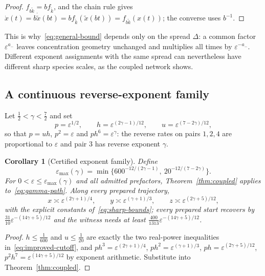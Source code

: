 \documentclass[11pt,a4paper]{article}
\theoremstyle{plain}
\newtheorem{corollary}[theorem]{Corollary}
\theoremstyle{definition}
\theoremstyle{remark}
\newcommand{\eps}{\varepsilon}
\begin{document}
\begin{proof}
$f_{b\tilde k}=bf_{\tilde k}$, and the chain rule gives $\dot x(t)=b\dot{\tilde x}(bt)=bf_{\tilde k}(\tilde x(bt))=f_{b\tilde k}(x(t))$; the converse uses $b^{-1}$.
\end{proof}

This is why~\eqref{eq:general-bound} depends only on the spread $\Delta$: a common factor $\eps^{a_-}$ leaves concentration geometry unchanged and multiplies all times by $\eps^{-a_-}$. Different exponent assignments with the same spread can nevertheless have different sharp species scales, as the coupled network shows.

\subsection{A continuous reverse-exponent family}
Let $\tfrac12<\gamma<\tfrac72$ and set
\begin{equation}\label{eq:gamma-path}
 p=\eps^{1/2},\qquad h=\eps^{(2\gamma-1)/12},\qquad u=\eps^{(7-2\gamma)/12},
\end{equation}
so that $p=uh$, $p^2=\eps$ and $ph^6=\eps^\gamma$: the reverse rates on pairs $1,2,4$ are proportional to $\eps$ and pair $3$ has reverse exponent $\gamma$.

\begin{corollary}[Certified exponent family]\label{cor:gamma}
Define
\begin{equation}\label{eq:improved-cutoff}
 \eps_{\max}(\gamma)=\min\big\{600^{-12/(2\gamma-1)},\ 20^{-12/(7-2\gamma)}\big\}.
\end{equation}
For $0<\eps\le\eps_{\max}(\gamma)$ and all admitted prefactors, Theorem~\ref{thm:coupled} applies to~\eqref{eq:gamma-path}. Along every prepared trajectory,
\begin{equation}\label{eq:gamma-orders}
 x\asymp\eps^{(2\gamma+1)/4},\qquad y\asymp\eps^{(\gamma+1)/3},\qquad z\asymp\eps^{(2\gamma+5)/12},
\end{equation}
with the explicit constants of~\eqref{eq:sharp-bounds}; every prepared start recovers by $\tfrac{31}{10}\eps^{-(14\gamma+5)/12}$ and the witness needs at least $\tfrac{400}{1313}\eps^{-(14\gamma+5)/12}$.
\end{corollary}

\begin{proof}
$h\le\tfrac1{600}$ and $u\le\tfrac1{20}$ are exactly the two real-power inequalities in~\eqref{eq:improved-cutoff}, and $ph^3=\eps^{(2\gamma+1)/4}$, $ph^2=\eps^{(\gamma+1)/3}$, $ph=\eps^{(2\gamma+5)/12}$, $p^2h^7=\eps^{(14\gamma+5)/12}$ by exponent arithmetic. Substitute into Theorem~\ref{thm:coupled}.
\end{proof}
\end{document}
